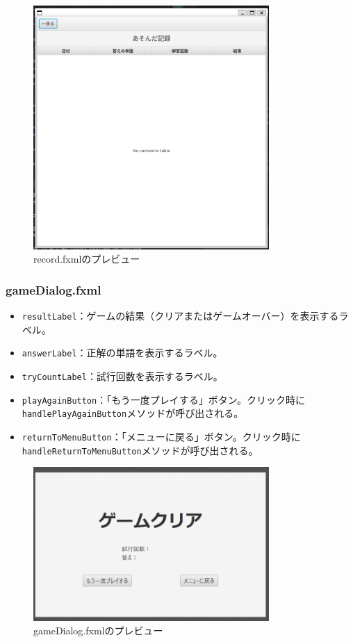 \documentclass[a4j]{ujarticle}
\begin{document}
\begin{figure}[h]
\centering
\includegraphics[width=0.8\textwidth]{record_preview.png}
\caption{record.fxmlのプレビュー}
\label{fig:record_fxml}
\end{figure}

\subsubsection{gameDialog.fxml}

\begin{itemize}
  \item \texttt{resultLabel}：ゲームの結果（クリアまたはゲームオーバー）を表示するラベル。
  \item \texttt{answerLabel}：正解の単語を表示するラベル。
  \item \texttt{tryCountLabel}：試行回数を表示するラベル。
  \item \texttt{playAgainButton}：「もう一度プレイする」ボタン。クリック時に\texttt{handlePlayAgainButton}メソッドが呼び出される。
  \item \texttt{returnToMenuButton}：「メニューに戻る」ボタン。クリック時に\texttt{handleReturnToMenuButton}メソッドが呼び出される。
\end{itemize}

\begin{figure}[h]
\centering
\includegraphics[width=0.8\textwidth]{gameDialog_preview.png}
\caption{gameDialog.fxmlのプレビュー}
\label{fig:gameDialog_fxml}
\end{figure}
\end{document}
